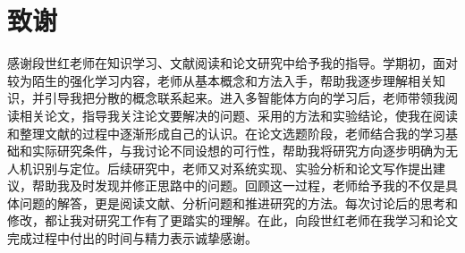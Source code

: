 \chapter*{致谢}

感谢段世红老师在知识学习、文献阅读和论文研究中给予我的指导。学期初，面对较为陌生的强化学习内容，老师从基本概念和方法入手，帮助我逐步理解相关知识，并引导我把分散的概念联系起来。进入多智能体方向的学习后，老师带领我阅读相关论文，指导我关注论文要解决的问题、采用的方法和实验结论，使我在阅读和整理文献的过程中逐渐形成自己的认识。在论文选题阶段，老师结合我的学习基础和实际研究条件，与我讨论不同设想的可行性，帮助我将研究方向逐步明确为无人机识别与定位。后续研究中，老师又对系统实现、实验分析和论文写作提出建议，帮助我及时发现并修正思路中的问题。回顾这一过程，老师给予我的不仅是具体问题的解答，更是阅读文献、分析问题和推进研究的方法。每次讨论后的思考和修改，都让我对研究工作有了更踏实的理解。在此，向段世红老师在我学习和论文完成过程中付出的时间与精力表示诚挚感谢。
